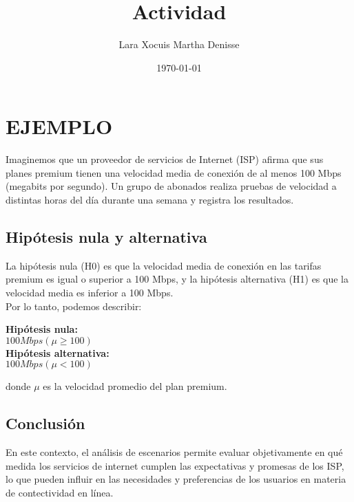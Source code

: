 \documentclass[letterpaper,12pt]{article}
\title {\textbf{Actividad}}
\author{Lara Xocuis Martha Denisse}
\date{\today}
\begin{document}
\maketitle
\begin{sloppypar} 
\section{\LARGE EJEMPLO}
Imaginemos que un proveedor de servicios de Internet (ISP) afirma que sus planes premium tienen una velocidad media de conexión de al menos 100 Mbps (megabits por segundo). Un grupo de abonados realiza pruebas de velocidad a distintas horas del día durante una semana y registra los resultados.
\subsection*{Hipótesis nula y alternativa}
La hipótesis nula (H0) es que la velocidad media de conexión en las tarifas premium es igual o superior a 100 Mbps, y la hipótesis alternativa (H1) es que la velocidad media es inferior a 100 Mbps.
\vspace{0.3cm}\\ 
Por lo tanto, podemos describir:
\begin{center}
  \textbf{Hipótesis nula:} \\
$100 Mbps (\mu \geq 100)$
\vspace{0.3cm}\\ 
\textbf{Hipótesis alternativa:} \\
$100Mbps (\mu < 100)$
\end{center}
donde $\mu$ es la velocidad promedio del plan premium.

\subsection*{Conclusión}
En este contexto, el análisis de escenarios permite evaluar objetivamente en qué medida los servicios de internet cumplen las expectativas y promesas de los ISP, lo que pueden influir en las necesidades y preferencias de los usuarios en materia de contectividad en línea.

\end{sloppypar}
\end{document}
